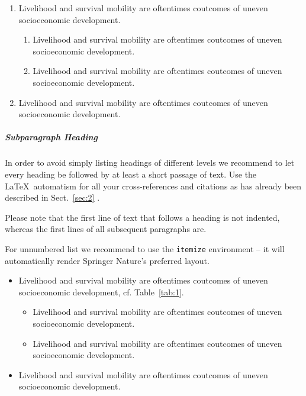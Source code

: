 \begin{enumerate}
\item{Livelihood and survival mobility are oftentimes coutcomes of uneven socioeconomic development.}
\begin{enumerate}
\item{Livelihood and survival mobility are oftentimes coutcomes of uneven socioeconomic development.}
\item{Livelihood and survival mobility are oftentimes coutcomes of uneven socioeconomic development.}
\end{enumerate}
\item{Livelihood and survival mobility are oftentimes coutcomes of uneven socioeconomic development.}
\end{enumerate}

\subparagraph{Subparagraph Heading} In order to avoid simply listing headings of different levels we recommend to let every heading be followed by at least a short passage of text. Use the \LaTeX\ automatism for all your cross-references and citations as has already been described in Sect.~\ref{sec:2}%
.

Please note that the first line of text that follows a heading is not indented, whereas the first lines of all subsequent paragraphs are.

For unnumbered list we recommend to use the \verb|itemize| environment -- it will automatically render Springer Nature's preferred layout.

\begin{itemize}
\item{Livelihood and survival mobility are oftentimes coutcomes of uneven socioeconomic development, cf. Table~\ref{tab:1}.}
\begin{itemize}
\item{Livelihood and survival mobility are oftentimes coutcomes of uneven socioeconomic development.}
\item{Livelihood and survival mobility are oftentimes coutcomes of uneven socioeconomic development.}
\end{itemize}
\item{Livelihood and survival mobility are oftentimes coutcomes of uneven socioeconomic development.}
\end{itemize}

%
%


